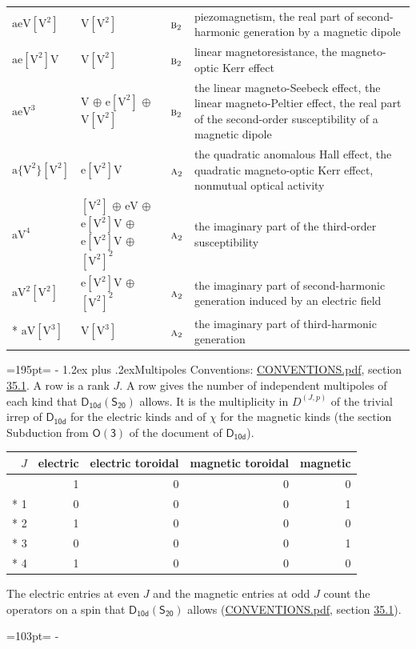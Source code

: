 \documentclass[10pt,a4paper]{article}
\makeatletter
\renewcommand\section{\@startsection{section}{1}{\z@}{-3ex plus -1ex minus -.2ex}%
  {1.2ex plus .2ex}{\normalfont\large\sffamily\bfseries\color{parttitle}}}
\newcommand{\needspace}[1]{\par\penalty-100\begingroup\dimen0=#1\relax\dimen2=\pagegoal
  \advance\dimen2-\pagetotal\ifdim\dimen0>\dimen2\relax\ifdim\dimen2>0pt\vfil\break\fi\fi
  \endgroup}
\numberwithin{equation}{section}
\newcommand{\grp}[1]{\mathsf{#1}}
\newcommand{\irr}[1]{\text{\normalfont\scshape #1}}
\newcommand{\irrJp}[2]{D^{(#1,#2)}}
\newcommand{\jahn}[1]{\mathrm{#1}}
\newlength{\fillwidth}\newlength{\cellwidth}\newlength{\colwidth}
\makeatother
\begin{document}
{\begin{longtable}{@{}lll>{\RaggedRight\arraybackslash}p{\fillwidth}@{}}
$\jahn{aeV[V^{2}]}$ & $\jahn{V[V^{2}]}$ & $\irr{b}_{2}$ & piezomagnetism, the real part of second-harmonic generation by a magnetic dipole\\
$\jahn{ae[V^{2}]V}$ & $\jahn{V[V^{2}]}$ & $\irr{b}_{2}$ & linear magnetoresistance, the magneto-optic Kerr effect\\
$\jahn{aeV^{3}}$ & $\jahn{V}$ $\oplus$ $\jahn{e[V^{2}]}$ $\oplus$ $\jahn{V[V^{2}]}$ & $\irr{b}_{2}$ & the linear magneto-Seebeck effect, the linear magneto-Peltier effect, the real part of the second-order susceptibility of a magnetic dipole\\
$\jahn{a\{V^{2}\}[V^{2}]}$ & $\jahn{e[V^{2}]V}$ & $\irr{a}_{2}$ & the quadratic anomalous Hall effect, the quadratic magneto-optic Kerr effect, nonmutual optical activity\\
$\jahn{aV^{4}}$ & $\jahn{[V^{2}]}$ $\oplus$ $\jahn{eV}$ $\oplus$ $\jahn{e[V^{2}]V}$ $\oplus$ $\jahn{e[V^{2}]V}$ $\oplus$ $\jahn{[V^{2}]^{2}}$ & $\irr{a}_{2}$ & the imaginary part of the third-order susceptibility\\
$\jahn{aV^{2}[V^{2}]}$ & $\jahn{e[V^{2}]V}$ $\oplus$ $\jahn{[V^{2}]^{2}}$ & $\irr{a}_{2}$ & the imaginary part of second-harmonic generation induced by an electric field\\*
$\jahn{aV[V^{3}]}$ & $\jahn{V[V^{3}]}$ & $\irr{a}_{2}$ & the imaginary part of third-harmonic generation\\
\bottomrule\end{longtable}}
\needspace{195pt}
\section{Multipoles}\label{s:multipoles}
Conventions: \href{../../CONVENTIONS.pdf}{CONVENTIONS.pdf}, section \href{../../CONVENTIONS.pdf\#conv.35.1}{35.1}.
A row is a rank $J$. \label{n:head.multipole.electric}\label{n:head.multipole.electric.toroidal}\label{n:head.multipole.magnetic.toroidal}\label{n:head.multipole.magnetic}A row gives the number of independent multipoles of each kind that $\grp{D_{10d}}(\grp{S_{20}})$ allows. It is the multiplicity in $\irrJp{J}{p}$ of the trivial irrep of $\grp{D_{10d}}$ for the electric kinds and of $\chi$ for the magnetic kinds (the section Subduction from $\grp{O(3)}$ of the document of \href{../../../rotation/data/pdf/D10d.pdf}{$\grp{D_{10d}}$}).
{\small\begin{longtable}{@{}rrrrr@{}}\toprule
$J$ & electric & electric toroidal & magnetic toroidal & magnetic\\\midrule\endhead
\bottomrule\endfoot\endlastfoot
0 & 1 & 0 & 0 & 0\\*
1 & 0 & 0 & 0 & 1\\*
2 & 1 & 0 & 0 & 0\\*
3 & 0 & 0 & 0 & 1\\*
4 & 1 & 0 & 0 & 0\\
\bottomrule\end{longtable}}
The electric entries at even $J$ and the magnetic entries at odd $J$ count the operators on a spin that $\grp{D_{10d}}(\grp{S_{20}})$ allows (\href{../../CONVENTIONS.pdf}{CONVENTIONS.pdf}, section \href{../../CONVENTIONS.pdf\#conv.35.1}{35.1}).
\needspace{103pt}
\end{document}
